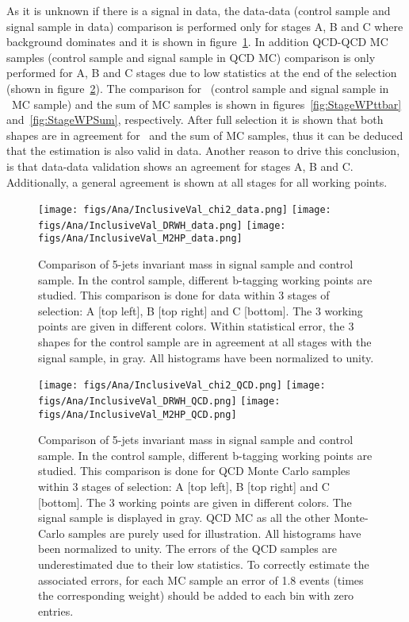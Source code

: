 As it is unknown if there is a signal in data, the data-data (control sample and signal sample in data) comparison is performed only for stages A, B and C where background dominates and it is shown in figure~\ref{fig:StageWPData}. In addition QCD-QCD MC samples (control sample and signal sample in QCD MC) comparison is only performed for A, B and C stages due to low statistics at the end of the selection (shown in figure~\ref{fig:StageWPQCD}). The comparison for \ttbar~(control sample and signal sample in \ttbar~MC sample) and the sum of MC samples is shown in figures~\ref{fig:StageWPttbar} and~\ref{fig:StageWPSum}, respectively. After full selection it is shown that both shapes are in agreement for \ttbar~and the sum of MC samples, thus it can be deduced that the estimation is also valid in data. Another reason to drive this conclusion, is that data-data validation shows an agreement for stages A, B and C. Additionally, a general agreement is shown at all stages for all working points.

\begin{figure}[!Hhtbp]
  \begin{center}
    \texttt{[image: figs/Ana/InclusiveVal\_chi2\_data.png]}
    \texttt{[image: figs/Ana/InclusiveVal\_DRWH\_data.png]}
    \texttt{[image: figs/Ana/InclusiveVal\_M2HP\_data.png]}
    \caption{Comparison of 5-jets invariant mass in signal sample and control sample. In the control sample, different b-tagging working points are studied. This comparison is done for data within 3 stages of selection: A [top left], B [top right] and C [bottom]. The 3 working points are given in different colors. Within statistical error, the 3 shapes for the control sample are in agreement at all stages with the signal sample, in gray. All histograms have been normalized to unity.}
    \label{fig:StageWPData}
  \end{center}
\end{figure}

\begin{figure}[!Hhtbp]
  \begin{center}
    \texttt{[image: figs/Ana/InclusiveVal\_chi2\_QCD.png]}
    \texttt{[image: figs/Ana/InclusiveVal\_DRWH\_QCD.png]}
    \texttt{[image: figs/Ana/InclusiveVal\_M2HP\_QCD.png]}
    \caption{Comparison of 5-jets invariant mass in signal sample and control sample. In the control sample, different b-tagging working points are studied. This comparison is done for QCD Monte Carlo samples within 3 stages of selection: A [top left], B [top right] and C [bottom]. The 3 working points are given in different colors. The signal sample is displayed in gray. QCD MC as all the other Monte-Carlo samples are purely used for illustration. All histograms have been normalized to unity. The errors of the QCD samples are underestimated due to their low statistics. To correctly estimate the associated errors, for each MC sample an error of 1.8 events (times the corresponding weight) should be added to each bin with zero entries.}
    \label{fig:StageWPQCD}
  \end{center}
\end{figure}

